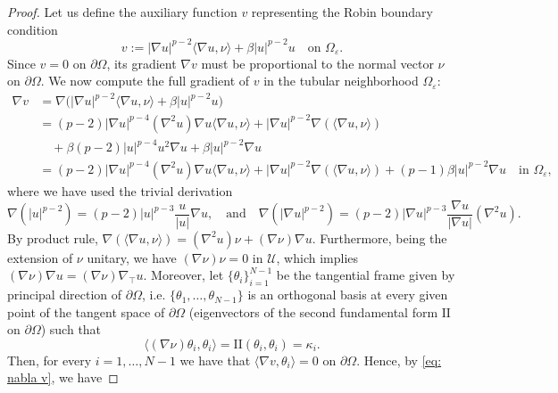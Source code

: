 \documentclass[10pt,a4paper]{amsart}
\numberwithin{equation}{section}
\begin{document}
\begin{proof}
    Let us define the auxiliary function $v$ representing the Robin boundary condition
    \begin{equation*}
    v := |\nabla u|^{p-2} \langle \nabla u, \nu \rangle + \beta |u|^{p-2}u \quad \text{on } \Omega_\varepsilon.
    \end{equation*}
    Since $v = 0$ on $\partial\Omega$, its gradient $\nabla v$ must be proportional to the normal vector $\nu$ on $\partial\Omega$. We now compute the full gradient of $v$ in the tubular neighborhood $\Omega_\varepsilon$:
    \begin{equation}\label{eq: nabla v}
        \begin{aligned}
        \nabla v &= \nabla \big( |\nabla u|^{p-2} \langle \nabla u, \nu \rangle + \beta |u|^{p-2}u \big)  \\
        &= (p-2)|\nabla u|^{p-4} (\nabla^2 u)\nabla u \langle \nabla u, \nu \rangle + |\nabla u|^{p-2} \nabla ( \langle \nabla u, \nu \rangle ) \\
        &\quad + \beta (p-2)|u|^{p-4}u^2 \nabla u + \beta|u|^{p-2}\nabla u \\
        &= (p-2)|\nabla u|^{p-4} (\nabla^2 u)\nabla u \langle \nabla u, \nu \rangle + |\nabla u|^{p-2} \nabla ( \langle \nabla u, \nu \rangle ) 
        + (p-1) \beta |u|^{p-2} \nabla u \quad \text{in } \Omega_\varepsilon,
        \end{aligned}
    \end{equation}
    where we have used the trivial derivation
    \begin{equation*}
        \nabla (|u|^{p-2}) = (p-2) |u|^{p-3} \frac{u}{|u|} \nabla u, \quad \text{and} \quad \nabla (|\nabla u|^{p-2}) = (p-2) |\nabla u|^{p-3} \frac{\nabla u}{|\nabla u|} (\nabla^2 u).
    \end{equation*}
    By product rule, $\nabla (\langle \nabla u, \nu \rangle) = (\nabla^2 u) \nu + (\nabla \nu) \nabla u$. Furthermore, being the extension of $\nu$ unitary, we have $(\nabla \nu)\nu = 0$ in $\mathcal{U}$, which implies $(\nabla \nu)\nabla u = (\nabla \nu)\nabla_\top u$.
    Moreover, let $\{\theta_i\}_{i=1}^{N-1}$ be the tangential frame given by principal direction of $\partial\Omega$, i.e. $\{ \theta_1, \dots, \theta_{N-1} \}$ is an orthogonal basis at every given point of the tangent space of $\partial\Omega$ (eigenvectors of the second fundamental form $\mathrm{I\!I}$ on $\partial\Omega$) such that 
    \[
    \langle (\nabla \nu) \theta_i, \theta_i \rangle = \mathrm{I\!I}(\theta_i,\theta_i) = \kappa_i.
    \]
    Then, for every $i=1,\dots,N-1$ we have that $\langle \nabla v, \theta_i \rangle = 0$ on $\partial\Omega$. Hence, by \eqref{eq: nabla v}, we have 

\end{proof}
\end{document}
